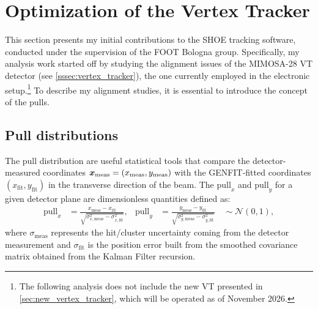 \section{Optimization of the Vertex Tracker}\label{sec:optim_vt}
This section presents my initial contributions to the SHOE tracking software, conducted under the supervision of the FOOT Bologna group. Specifically, my analysis work started off by studying the alignment issues of the MIMOSA-28 VT detector (see \autoref{sssec:vertex_tracker}), the one currently employed in the electronic setup.\footnote{The following analysis does not include the new VT presented in \autoref{sec:new_vertex_tracker}, which will be operated as of November 2026.} To describe my alignment studies, it is essential to introduce the concept of the pulls.
\subsection{Pull distributions}\label{ssec:pull_distributions}
The pull distribution are useful statistical tools that compare the detector-measured coordinates $\boldsymbol{x}_\text{meas}=(x_\text{meas},y_\text{meas})$ with the GENFIT-fitted coordinates $(x_\text{fit},y_\text{fit})$ in the transverse direction of the beam. The $\text{pull}_x$ and $\text{pull}_y$ for a given detector plane are dimensionless quantities defined as:
\begin{equation}
	\begin{aligned}
		\text{pull}_x &=
		\frac{x_{\text{meas}}-x_{\text{fit}}}
		{\sqrt{\sigma^2_{x,\text{meas}}-\sigma^2_{x,\text{fit}}}},
		&
		\text{pull}_y &=
		\frac{y_{\text{meas}}-y_{\text{fit}}}
		{\sqrt{\sigma^2_{y,\text{meas}}-\sigma^2_{y,\text{fit}}}}
		\quad \sim \mathcal{N}(0,1),
	\end{aligned}
	\label{eq:pull_distributions}
\end{equation}
where $\sigma_\text{meas}$ represents the hit/cluster uncertainty coming from the detector measurement and $\sigma_\text{fit}$ is the position error built from the smoothed covariance matrix obtained from the Kalman Filter recursion.

